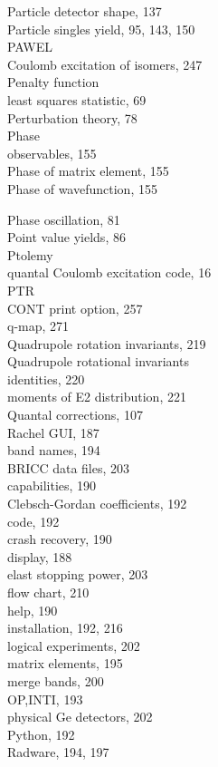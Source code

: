 \documentclass[10pt]{article}
\begin{document}
Particle detector shape, 137\\
Particle singles yield, 95, 143, 150\\
PAWEL\\
Coulomb excitation of isomers, 247\\
Penalty function\\
least squares statistic, 69\\
Perturbation theory, 78\\
Phase\\
observables, 155\\
Phase of matrix element, 155\\
Phase of wavefunction, 155

Phase oscillation, 81\\
Point value yields, 86\\
Ptolemy\\
quantal Coulomb excitation code, 16\\
PTR\\
CONT print option, 257\\
q-map, 271\\
Quadrupole rotation invariants, 219\\
Quadrupole rotational invariants\\
identities, 220\\
moments of E2 distribution, 221\\
Quantal corrections, 107\\
Rachel GUI, 187\\
band names, 194\\
BRICC data files, 203\\
capabilities, 190\\
Clebsch-Gordan coefficients, 192\\
code, 192\\
crash recovery, 190\\
display, 188\\
elast stopping power, 203\\
flow chart, 210\\
help, 190\\
installation, 192, 216\\
logical experiments, 202\\
matrix elements, 195\\
merge bands, 200\\
OP,INTI, 193\\
physical Ge detectors, 202\\
Python, 192\\
Radware, 194, 197\\
\end{document}
